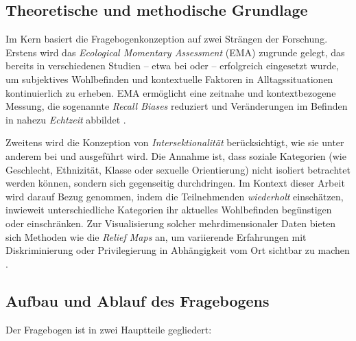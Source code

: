 \subsection{Theoretische und methodische Grundlage}
Im Kern basiert die Fragebogenkonzeption auf zwei Strängen der Forschung. Erstens wird das \emph{Ecological Momentary Assessment} (EMA) zugrunde gelegt, das bereits in verschiedenen Studien – etwa bei \parencite{shiffman_ecological_2008} oder \parencite{bakolis_urban_2018} – erfolgreich eingesetzt wurde, um subjektives Wohlbefinden und kontextuelle Faktoren in Alltagssituationen kontinuierlich zu erheben. EMA ermöglicht eine zeitnahe und kontextbezogene Messung, die sogenannte \emph{Recall Biases} reduziert und Veränderungen im Befinden in nahezu \emph{Echtzeit} abbildet \parencite{stone_ecological_1994}.

Zweitens wird die Konzeption von \emph{Intersektionalität} berücksichtigt, wie sie unter anderem bei \parencite{crenshaw_mapping_1991} und \parencite{collins_black_2002} ausgeführt wird. Die Annahme ist, dass soziale Kategorien (wie Geschlecht, Ethnizität, Klasse oder sexuelle Orientierung) nicht isoliert betrachtet werden können, sondern sich gegenseitig durchdringen. Im Kontext dieser Arbeit wird darauf Bezug genommen, indem die Teilnehmenden \emph{wiederholt} einschätzen, inwieweit unterschiedliche Kategorien ihr aktuelles Wohlbefinden begünstigen oder einschränken. Zur Visualisierung solcher mehrdimensionaler Daten bieten sich Methoden wie die \emph{Relief Maps} an, um variierende Erfahrungen mit Diskriminierung oder Privilegierung in Abhängigkeit vom Ort sichtbar zu machen \parencite{rodo-de-zarate_developing_2014}.

\subsection{Aufbau und Ablauf des Fragebogens}
Der Fragebogen ist in zwei Hauptteile gegliedert:

